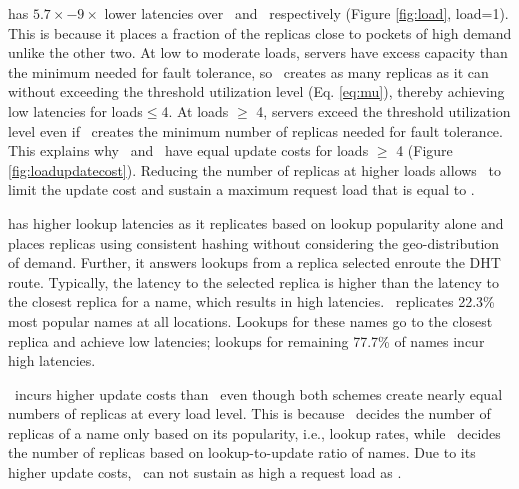 {\em{\auspice}}  has $5.7\times-9\times$ lower latencies over \staticthree\ and \codons\ respectively (Figure \ref{fig:load}, load=1). This is because it places a fraction of the replicas close to pockets of high demand unlike the other two.  At low to moderate loads, servers have excess capacity than the minimum needed for fault tolerance, so \auspice\ creates as many replicas as it can without exceeding the threshold utilization level (Eq. \ref{eq:mu}), thereby  achieving low latencies for loads$\leq$4. 
At loads $\geq$ 4, servers exceed the threshold utilization level even if \auspice\ creates the minimum number of replicas needed for fault tolerance. This explains why \auspice\ and \staticthree\ have equal update costs for loads $\geq$ 4 (Figure \ref{fig:loadupdatecost}). Reducing the number of replicas at higher loads allows \auspice\ to limit the update cost and sustain a maximum request load that is equal to \staticthree. 

{\em{\codons}}  has higher lookup latencies as it replicates based on lookup popularity alone and places replicas using consistent hashing without considering the geo-distribution of demand. Further, it answers lookups from a replica selected enroute the DHT route. Typically, the latency to the selected replica  is higher than the latency to the closest replica for a name, which results in high latencies.  \codons\ replicates 22.3\%   most popular names at all locations. Lookups for these names go to the closest replica and achieve low latencies; lookups for remaining 77.7\% of names incur high latencies.

\codons\  incurs higher update costs than \auspice\   even though both schemes create nearly equal numbers of replicas at every load level. This is because \codons\ decides the number of replicas of a name only based on its popularity, i.e., lookup rates, while \auspice\ decides the number of replicas based on lookup-to-update ratio of names. Due to its higher update costs, \codons\  can not sustain as high a request load as \auspice.

